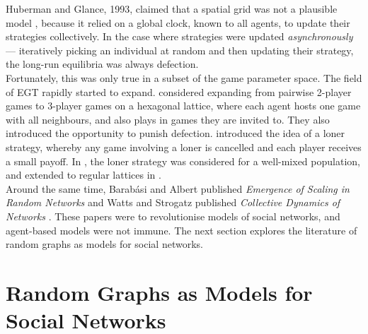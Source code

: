  Huberman and Glance, 1993, claimed that a spatial grid was not a plausible model \cite{RN63}, because it relied on a global clock, known to all agents, to update their strategies collectively. In the case where strategies were updated \emph{asynchronously} --- iteratively picking an individual at random and then updating their strategy, the long-run equilibria was always defection. \\
 
 Fortunately, this was only true in a subset of the game parameter space. The field of EGT rapidly started to expand. \cite{RN45} considered expanding from pairwise 2-player games to 3-player games on a hexagonal lattice, where each agent hosts one game with all neighbours, and also plays in games they are invited to. They also introduced the opportunity to punish defection. \cite{RN66} introduced the idea of a loner strategy, whereby any game involving a loner is cancelled and each player receives a small payoff. In  \cite{RN67}, the loner strategy was considered for a well-mixed population, and extended to regular lattices in \cite{RN66}. \\
 
 Around the same time, Barab\'{a}si and Albert published \emph{Emergence of Scaling in Random Networks} \cite{RN55} and Watts and Strogatz published \emph{Collective Dynamics of  Networks} \cite{RN58}. These papers were to revolutionise models of social networks, and agent-based models were not immune. The next section explores the literature of random graphs as models for social networks. \\
 
 \section{Random Graphs as Models for Social Networks} \label{RG}
 
